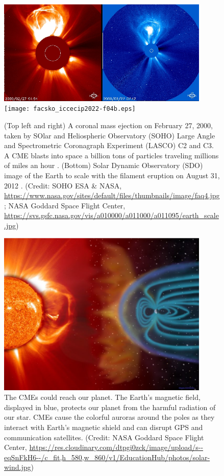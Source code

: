 \documentclass[sn-aps]{sn-jnl}%
\begin{document}
\begin{figure}[h]
\centering
\includegraphics[width=0.9\textwidth]{facsko_iccecip2022-f04a.eps}
\texttt{[image: facsko\_iccecip2022-f04b.eps]}
\caption{(Top left and right) A coronal mass ejection on February 27, 2000, taken by SOlar and Heliospheric Observatory (SOHO) Large Angle and Spectrometric Coronagraph Experiment (LASCO) C2 and C3. A CME blasts into space a billion tons of particles traveling millions of miles an hour \cite{brueckner95:_large_angle_spect_coron_lasco,domingo95:_soho}. (Bottom) Solar Dynamic Observatory (SDO) image of the Earth to scale with the filament eruption on August 31, 2012 \cite{pesnell12:_solar_dynam_obser_sdo}. (Credit: SOHO ESA \& NASA, \url{https://www.nasa.gov/sites/default/files/thumbnails/image/faq4.jpg}; NASA Goddard Space Flight Center, \url{https://svs.gsfc.nasa.gov/vis/a010000/a011000/a011095/earth\_scale.jpg})}\label{fig:cme}
\end{figure}

\begin{figure}[h]
\centering
\includegraphics[width=0.9\textwidth]{facsko_iccecip2022-f05.eps}
\caption{The CMEs could reach our planet. The Earth's magnetic field, displayed in blue, protects our planet from the harmful radiation of our star. CMEs cause the colorful auroras around the poles as they interact with Earth's magnetic shield and can disrupt GPS and communication satellites. (Credit: NASA Goddard Space Flight Center, \url{https://res.cloudinary.com/dtpgi0zck/image/upload/s--eqSnFkH6--/c_fit,h_580,w_860/v1/EducationHub/photos/solar-wind.jpg})}\label{fig:cmeearth}
\end{figure}
\end{document}
